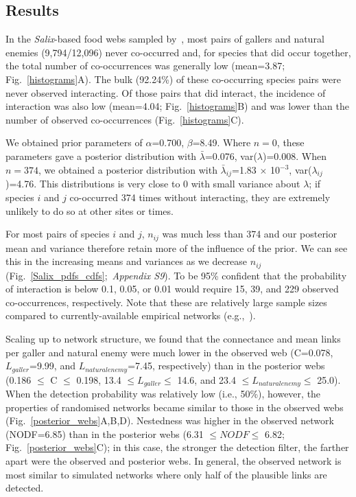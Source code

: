 \documentclass[12pt]{article}
\begin{document}
\begin{spacing}{2.0}
\section*{Results}

  In the \emph{Salix}-based food webs sampled by~\citet{Kopelke2017}, most pairs of gallers and natural enemies (9,794/12,096) never co-occurred and, for species that did occur together, the total number of co-occurrences was generally low (mean=3.87; Fig.~\ref{histograms}A). The bulk (92.24\%) of these co-occurring species pairs were never observed interacting. Of those pairs that did interact, the incidence of interaction was also low (mean=4.04; Fig.~\ref{histograms}B) and was lower than the number of observed co-occurrences (Fig.~\ref{histograms}C).


  We obtained prior parameters of $\alpha$=0.700, $\beta$=8.49. Where $n = 0$, these parameters gave a posterior distribution with $\bar\lambda$=0.076, var($\lambda$)=0.008. When $n = 374$, we obtained a posterior distribution with $\bar\lambda_{ij}$=1.83 $\times$ 10$^{-3}$, var($\lambda_{ij}$)=4.76. This distributions is very close to 0 with small variance about $\lambda$; if species $i$ and $j$ co-occurred 374 times without interacting, they   are extremely unlikely to do so at other sites or times. 


  For most pairs of species $i$ and $j$, $n_{ij}$ was much less than 374 and our posterior mean and variance therefore retain more of the influence of the prior. We can see this in the increasing means and variances as we decrease $n_{ij}$ (Fig.~\ref{Salix_pdfs_cdfs};~\emph{Appendix S9}). To be 95\% confident that the probability of interaction is below 0.1, 0.05, or 0.01 would require 15, 39, and 229 observed co-occurrences, respectively. Note that these are relatively large sample sizes compared to currently-available empirical networks (e.g.,~\citealp{Morris2014}).


  Scaling up to network structure, we found that the connectance and mean links per galler and natural enemy were much lower in the observed web (C=0.078, $L_{galler}$=9.99, and $L_{natural enemy}$=7.45, respectively) than in the posterior webs (0.186 $\leq$ C $\leq$ 0.198, 13.4 $\leq L_{galler} \leq$ 14.6, and 23.4 $\leq L_{natural enemy} \leq$ 25.0). When the detection probability was relatively low (i.e., 50\%), however, the properties of randomised networks became similar to those in the observed webs (Fig.~\ref{posterior_webs}A,B,D). Nestedness was higher in the observed network (NODF=6.85) than in the posterior webs (6.31 $\leq NODF \leq$ 6.82; Fig.~\ref{posterior_webs}C); in this case, the stronger the detection filter, the farther apart were the observed and posterior webs. In general, the observed network is most similar to simulated networks where only half of the plausible links are detected. 


\end{spacing}
\end{document}
